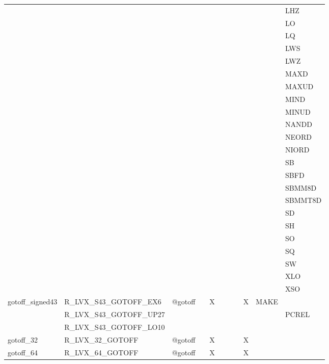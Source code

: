 {\begin{tabular}{|l|l|l|l|l|l|l|l|l|l|l|}
 & & & & & & & & & & \textsf{LHZ} \\
 & & & & & & & & & & \textsf{LO} \\
 & & & & & & & & & & \textsf{LQ} \\
 & & & & & & & & & & \textsf{LWS} \\
 & & & & & & & & & & \textsf{LWZ} \\
 & & & & & & & & & & \textsf{MAXD} \\
 & & & & & & & & & & \textsf{MAXUD} \\
 & & & & & & & & & & \textsf{MIND} \\
 & & & & & & & & & & \textsf{MINUD} \\
 & & & & & & & & & & \textsf{NANDD} \\
 & & & & & & & & & & \textsf{NEORD} \\
 & & & & & & & & & & \textsf{NIORD} \\
 & & & & & & & & & & \textsf{SB} \\
 & & & & & & & & & & \textsf{SBFD} \\
 & & & & & & & & & & \textsf{SBMM8D} \\
 & & & & & & & & & & \textsf{SBMMT8D} \\
 & & & & & & & & & & \textsf{SD} \\
 & & & & & & & & & & \textsf{SH} \\
 & & & & & & & & & & \textsf{SO} \\
 & & & & & & & & & & \textsf{SQ} \\
 & & & & & & & & & & \textsf{SW} \\
 & & & & & & & & & & \textsf{XLO} \\
 & & & & & & & & & & \textsf{XSO} \\
\hline
\textsf{gotoff\_signed43} & \textsf{R\_LVX\_S43\_GOTOFF\_EX6} & \textsf{@gotoff} & \textsf{} & \textsf{X} & \textsf{} & \textsf{} & \textsf{} & \textsf{X} & \textsf{MAKE} \\
 & \textsf{R\_LVX\_S43\_GOTOFF\_UP27} & & & & & & & & & \textsf{PCREL} \\
 & \textsf{R\_LVX\_S43\_GOTOFF\_LO10} & & & & & & & & & \\
\hline
\textsf{gotoff\_32} & \textsf{R\_LVX\_32\_GOTOFF} & \textsf{@gotoff} & \textsf{} & \textsf{X} & \textsf{} & \textsf{} & \textsf{} & \textsf{X} & \textsf{} \\
\hline
\textsf{gotoff\_64} & \textsf{R\_LVX\_64\_GOTOFF} & \textsf{@gotoff} & \textsf{} & \textsf{X} & \textsf{} & \textsf{} & \textsf{} & \textsf{X} & \textsf{} \\

\end{tabular}}
